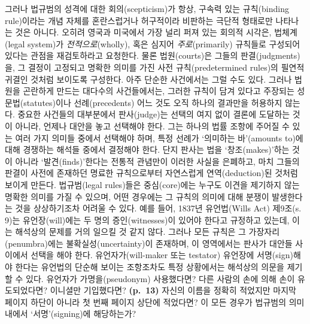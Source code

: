 \documentclass[12pt, oneside]{book}  %
\begin{document}
그러나 법규범의 성격에 대한 회의(scepticism)가 항상, 구속력 있는
규칙(binding rule)이라는 개념 자체를 혼란스럽거나 허구적이라 비판하는
극단적 형태로만 나타나는 것은 아니다. 오히려 영국과 미국에서 가장 널리
퍼져 있는 회의적 시각은, 법체계(legal system)가 \emph{전적으로}(wholly),
혹은 심지어 \emph{주로}(primarily) 규칙들로 구성되어 있다는 관점을
재검토하라고 요청한다. 물론 법원(courts)은 그들의 판결(judgments)을, 그
결정이 고정되고 명확한 의미를 가진 사전 규칙(predetermined rules)의
필연적 귀결인 것처럼 보이도록 구성한다. 아주 단순한 사건에서는 그럴 수도
있다. 그러나 법원을 곤란하게 만드는 대다수의 사건들에서는, 그러한 규칙이
담겨 있다고 주장되는 성문법(statutes)이나 선례(precedents) 어느 것도
오직 하나의 결과만을 허용하지 않는다. 중요한 사건들의 대부분에서
판사(judge)는 선택의 여지 없이 결론에 도달하는 것이 아니라, 언제나
대안을 놓고 선택해야 한다. 그는 하나의 법률 조항에 주어질 수 있는 여러
가지 의미들 중에서 선택해야 하며, 특정 선례가 `의미하는 바'(amounts
to)에 대해 경쟁하는 해석들 중에서 결정해야 한다. 단지 판사는 법을
`창조(makes)'하는 것이 아니라 `발견(finds)'한다는 전통적 관념만이 이러한
사실을 은폐하고, 마치 그들의 판결이 사전에 존재하던 명료한 규칙으로부터
자연스럽게 연역(deduction)된 것처럼 보이게 만든다. 법규범(legal
rules)들은 중심(core)에는 누구도 이견을 제기하지 않는 명확한 의미를 가질
수 있으며, 어떤 경우에는 그 규칙의 의미에 대해 분쟁이 발생한다는 것을
상상하기조차 어려울 수 있다. 예를 들어, 1837년 유언법(Wills Act)
제9조(s. 9)는 유언장(will)에는 두 명의 증인(witnesses)이 있어야 한다고
규정하고 있는데, 이는 해석상의 문제를 거의 일으킬 것 같지 않다. 그러나
모든 규칙은 그 가장자리(penumbra)에는 불확실성(uncertainty)이 존재하며,
이 영역에서는 판사가 대안들 사이에서 선택을 해야 한다.
유언자가(will-maker 또는 testator) 유언장에 서명(sign)해야 한다는
유언법의 단순해 보이는 조항조차도 특정 상황에서는 해석상의 의문을 제기할
수 있다. 유언자가 가명을(pseudonym) 사용했다면? 다른 사람의 손에 의해
손이 유도되었다면? 이니셜만 기입했다면? \textbf{(p.~13)} 자신의 이름을
정확히 적었지만 마지막 페이지 하단이 아니라 첫 번째 페이지 상단에
적었다면? 이 모든 경우가 법규범의 의미 내에서 `서명'(signing)에
해당하는가?
\end{document}
